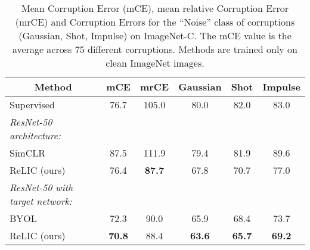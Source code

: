 \documentclass{article}
\begin{document}
 
\begin{table}[ht]
\caption{Mean Corruption Error (mCE), mean relative Corruption Error (mrCE) and Corruption Errors for the ``Noise'' class of corruptions (Gaussian, Shot, Impulse) on ImageNet-C. The mCE value is the average across $75$ different corruptions. Methods are trained only on clean ImageNet images.}
\label{table.imagenet_c}
\begin{center}
\begin{tabular}{lccccc}
\hline
\multicolumn{1}{c}{Method} & \multicolumn{1}{c}{mCE}  & \multicolumn{1}{c}{mrCE} & \multicolumn{1}{c}{Gaussian} & \multicolumn{1}{c}{Shot} & \multicolumn{1}{c}{Impulse} \\
\hline
Supervised &  76.7 & 105.0 & 80.0 & 82.0 & 83.0\\
\emph{ResNet-50 architecture:} \\
\quad SimCLR  &  87.5 & 111.9 & 79.4& 81.9& 89.6\\
\quad ReLIC (ours) &    76.4 & {\bf 87.7} & 67.8& 70.7& 77.0 \\
\emph{ResNet-50 with target network:} & & & \\
\quad BYOL  &  72.3 & 90.0 & 65.9& 68.4& 73.7 \\ 
\quad ReLIC (ours) &  {\bf 70.8} & 88.4 & {\bf 63.6} & {\bf 65.7} & {\bf 69.2}\\ 
\hline
\end{tabular}
\end{center}
\end{table}
\end{document}
